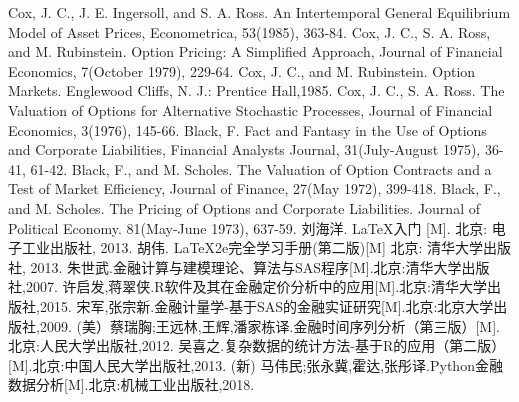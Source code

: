 

\begin{thebibliography}{1}
	  Cox, J. C., J. E. Ingersoll, and S. A. Ross. An Intertemporal General Equilibrium Model of Asset Prices, Econometrica, 53(1985), 363-84.
	 Cox, J. C., S. A. Ross, and M. Rubinstein. Option Pricing: A Simplified Approach, Journal of Financial Economics, 7(October 1979), 229-64.
	 Cox, J. C., and M. Rubinstein. Option Markets. Englewood Cliffs, N. J.: Prentice Hall,1985.
	 Cox, J. C., S. A. Ross. The Valuation of Options for Alternative Stochastic Processes, Journal of Financial Economics, 3(1976), 145-66.
	 Black, F. Fact and Fantasy in the Use of Options and Corporate Liabilities, Financial Analysts Journal, 31(July-August 1975), 36-41, 61-42.
	 Black, F., and M. Scholes. The Valuation of Option Contracts and a Test of Market Efficiency, Journal of Finance, 27(May 1972), 399-418.
	 Black, F., and M. Scholes. The Pricing of Options and Corporate Liabilities. Journal of Political Economy. 81(May-June 1973), 637-59.
	 刘海洋. \LaTeX 入门 [M]. 北京: 电子工业出版社, 2013.
	  胡伟. \LaTeX 2e完全学习手册(第二版)[M] 北京: 清华大学出版社, 2013.
	  朱世武.金融计算与建模理论、算法与SAS程序[M].北京:清华大学出版社,2007.
	  许启发,蒋翠侠.R软件及其在金融定价分析中的应用[M].北京:清华大学出版社,2015.
	  宋军,张宗新.金融计量学-基于SAS的金融实证研究[M].北京:北京大学出版社,2009.
	   (美）蔡瑞胸;王远林,王辉,潘家栋译.金融时间序列分析（第三版）[M].北京:人民大学出版社,2012.
	  吴喜之.复杂数据的统计方法-基于R的应用（第二版）[M].北京:中国人民大学出版社,2013.
	  (新) 马伟民;张永冀,霍达,张彤译.Python金融数据分析[M].北京:机械工业出版社,2018.
\end{thebibliography}